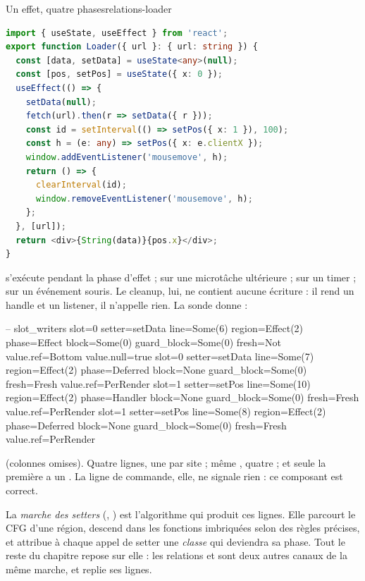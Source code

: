 \begin{exemple}{Un effet, quatre phases}{relations-loader}
\begin{lstlisting}[language=TypeScript,caption={\file{/tmp/relprobe/ex2.tsx}},label={lst:relations-loader}]
import { useState, useEffect } from 'react';
export function Loader({ url }: { url: string }) {
  const [data, setData] = useState<any>(null);
  const [pos, setPos] = useState({ x: 0 });
  useEffect(() => {
    setData(null);
    fetch(url).then(r => setData({ r }));
    const id = setInterval(() => setPos({ x: 1 }), 100);
    const h = (e: any) => setPos({ x: e.clientX });
    window.addEventListener('mousemove', h);
    return () => {
      clearInterval(id);
      window.removeEventListener('mousemove', h);
    };
  }, [url]);
  return <div>{String(data)}{pos.x}</div>;
}
\end{lstlisting}
 s'exécute pendant la phase d'effet ;  sur une microtâche ultérieure ;  sur un timer ;  sur un événement souris. Le cleanup, lui, ne contient aucune écriture : il rend un handle et un listener, il n'appelle rien. La sonde donne :
\begin{sortie}
-- slot_writers
  slot=0 setter=setData line=Some(6)  region=Effect(2) phase=Effect   block=Some(0) guard_block=Some(0) fresh=Not   value.ref=Bottom value.null=true
  slot=0 setter=setData line=Some(7)  region=Effect(2) phase=Deferred block=None    guard_block=Some(0) fresh=Fresh value.ref=PerRender
  slot=1 setter=setPos  line=Some(10) region=Effect(2) phase=Handler  block=None    guard_block=Some(0) fresh=Fresh value.ref=PerRender
  slot=1 setter=setPos  line=Some(8)  region=Effect(2) phase=Deferred block=None    guard_block=Some(0) fresh=Fresh value.ref=PerRender
\end{sortie}
(colonnes  omises). Quatre lignes, une par site ; même , quatre  ; et seule la première a un . La ligne de commande, elle, ne signale rien : ce composant est correct.
\end{exemple}

La \emph{marche des setters} (, ) est l'algorithme qui produit ces lignes. Elle parcourt le CFG d'une région, descend dans les fonctions imbriquées selon des règles précises, et attribue à chaque appel de setter une \emph{classe} qui deviendra sa phase. Tout le reste du chapitre repose sur elle : les relations  et  sont deux autres canaux de la même marche, et  replie ses lignes.

